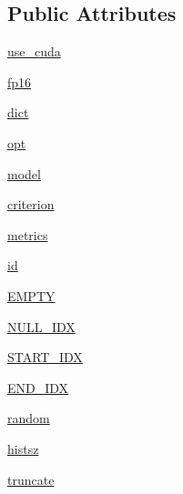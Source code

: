 \subsection*{Public Attributes}
\begin{DoxyCompactItemize}
\item 
\hyperlink{classparlai_1_1core_1_1torch__agent_1_1TorchAgent_a10b8d2605e619d5d3dc9f67777cb190a}{use\+\_\+cuda}
\item 
\hyperlink{classparlai_1_1core_1_1torch__agent_1_1TorchAgent_aa6f916e01d876679b529a893ad4f52f6}{fp16}
\item 
\hyperlink{classparlai_1_1core_1_1torch__agent_1_1TorchAgent_abebf29c0bb956bbc5ccc02777d2af3dd}{dict}
\item 
\hyperlink{classparlai_1_1core_1_1torch__agent_1_1TorchAgent_a785bb920cf8c8afc3e9bf6a8b77e335a}{opt}
\item 
\hyperlink{classparlai_1_1core_1_1torch__agent_1_1TorchAgent_afe40410d2e3b2565ecd27441266011fc}{model}
\item 
\hyperlink{classparlai_1_1core_1_1torch__agent_1_1TorchAgent_a13d46ae8aed6052679b62c3961a4de62}{criterion}
\item 
\hyperlink{classparlai_1_1core_1_1torch__agent_1_1TorchAgent_a392ed66573001dfa2846d5042e8fc5a5}{metrics}
\item 
\hyperlink{classparlai_1_1core_1_1torch__agent_1_1TorchAgent_a4ac66a09c1c164ea08f4b257c61c38a0}{id}
\item 
\hyperlink{classparlai_1_1core_1_1torch__agent_1_1TorchAgent_a3a80083f0e34d8abc15b50123efec884}{E\+M\+P\+TY}
\item 
\hyperlink{classparlai_1_1core_1_1torch__agent_1_1TorchAgent_a95cedd561757c9fc10dbf3a956e7f912}{N\+U\+L\+L\+\_\+\+I\+DX}
\item 
\hyperlink{classparlai_1_1core_1_1torch__agent_1_1TorchAgent_a2018afae9938937f80b61475314012cd}{S\+T\+A\+R\+T\+\_\+\+I\+DX}
\item 
\hyperlink{classparlai_1_1core_1_1torch__agent_1_1TorchAgent_a31bb7c8bf380660ee4e3822756563599}{E\+N\+D\+\_\+\+I\+DX}
\item 
\hyperlink{classparlai_1_1core_1_1torch__agent_1_1TorchAgent_a1ca476189900643fab04d1ac0ebfc719}{random}
\item 
\hyperlink{classparlai_1_1core_1_1torch__agent_1_1TorchAgent_a15cbb1f743c1d341d914ade47e49071b}{histsz}
\item 
\hyperlink{classparlai_1_1core_1_1torch__agent_1_1TorchAgent_a3ae27e9fe68d255a960bcb5180f48a65}{truncate}
\item 

\end{DoxyCompactItemize}
